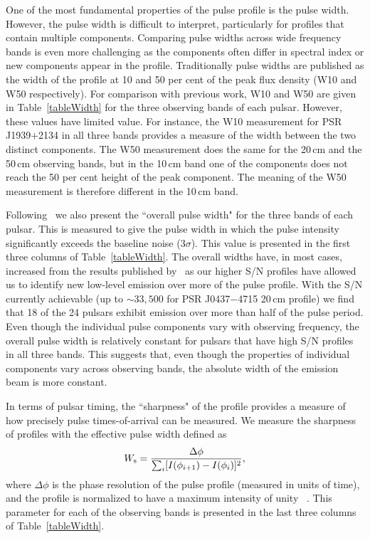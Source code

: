 \documentclass[useAMS,usenatbib]{mn2e}
\begin{document}
One of the most fundamental properties of the pulse profile is the pulse width. 
However, the pulse width is difficult to interpret, particularly for profiles 
that contain multiple components. Comparing pulse widths across wide frequency 
bands is even more challenging as the components often differ in spectral index or new 
components appear in the profile. Traditionally pulse widths are published as the 
width of the profile at 10 and 50 per cent of the peak flux density (W10 and W50 
respectively).  
%
For comparison with previous work, W10 and W50 are given in Table~\ref{tableWidth} 
for the three observing bands of each pulsar. 
%
However, these values have limited value. For instance, the W10 measurement for 
PSR J1939$+$2134 in all three bands provides a measure of the width between the 
two distinct components. The W50 measurement does the same for the 20\,cm and the 
50\,cm observing bands, but in the 10\,cm band one of the components does not reach 
the 50 per cent height of the peak component. The meaning of the W50 measurement 
is therefore different in the 10\,cm band. 
%

Following~\citet{Yan11} we also present the ``overall pulse width" for the three 
bands of each pulsar. This is measured to give the pulse width in which the pulse 
intensity significantly exceeds the baseline noise (3$\sigma$). This value is presented 
in the first three columns of Table~\ref{tableWidth}.   
%
The overall widths have, in most cases, increased from the results published by~\citet{Yan11} 
as our higher S/N profiles have allowed us to identify new low-level emission over 
more of the pulse profile. With the S/N currently achievable (up to $\sim33,500$ for 
PSR J0437$-$4715 20\,cm profile) we find that 18 of the 24 pulsars exhibit emission 
over more than half of the pulse period. 
%
Even though the individual pulse components vary with observing frequency, the 
overall pulse width is relatively constant for pulsars that have high S/N profiles in all 
three bands. This suggests that, even though the properties of individual components 
vary across observing bands, the absolute width of the emission beam is more constant.
%

In terms of pulsar timing, the ``sharpness" of the profile provides a measure of 
how precisely pulse times-of-arrival can be measured. We measure the sharpness of 
profiles with the effective pulse width defined as 
%
\begin{equation}
W_{\rm{s}}=\frac{\Delta \phi}{\sum_{i}[I(\phi_{i+1})-I(\phi_{i})]^2},
\end{equation}
%
where $\Delta \phi$ is the phase resolution of the pulse profile (measured in units 
of time), and the profile is normalized to have a maximum intensity of unity
~\citep{Cordes10,Shannon14}.
%
This parameter for each of the observing bands is presented in the last three columns 
of Table~\ref{tableWidth}.  
\end{document}
